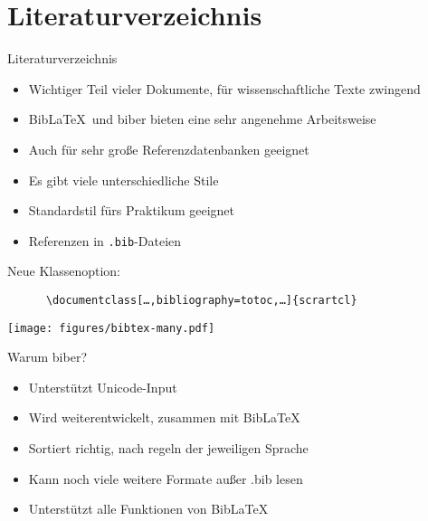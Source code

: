 \section{Literaturverzeichnis}

\begin{frame}[fragile]{Literaturverzeichnis}
  \begin{itemize}
    \item Wichtiger Teil vieler Dokumente, für wissenschaftliche Texte zwingend
    \item Bib\LaTeX\ und biber bieten eine sehr angenehme Arbeitsweise
    \item Auch für sehr große Referenzdatenbanken geeignet
    \item Es gibt viele unterschiedliche Stile
    \item Standardstil fürs Praktikum geeignet
    \item Referenzen in \texttt{.bib}-Dateien
  \end{itemize}
  \begin{block}{Neue Klassenoption:}
    \begin{lstlisting}
      \documentclass[…,bibliography=totoc,…]{scrartcl}
    \end{lstlisting}
  \end{block}
\end{frame}

\begin{frame}
  \centering
  \texttt{[image: figures/bibtex-many.pdf]}
\end{frame}

\begin{frame}{Warum biber?}
  \begin{itemize}
    \item Unterstützt Unicode-Input
    \item Wird weiterentwickelt, zusammen mit Bib\LaTeX
    \item Sortiert richtig, nach regeln der jeweiligen Sprache
    \item Kann noch viele weitere Formate außer .bib lesen
    \item Unterstützt alle Funktionen von Bib\LaTeX
  \end{itemize}
\end{frame}


